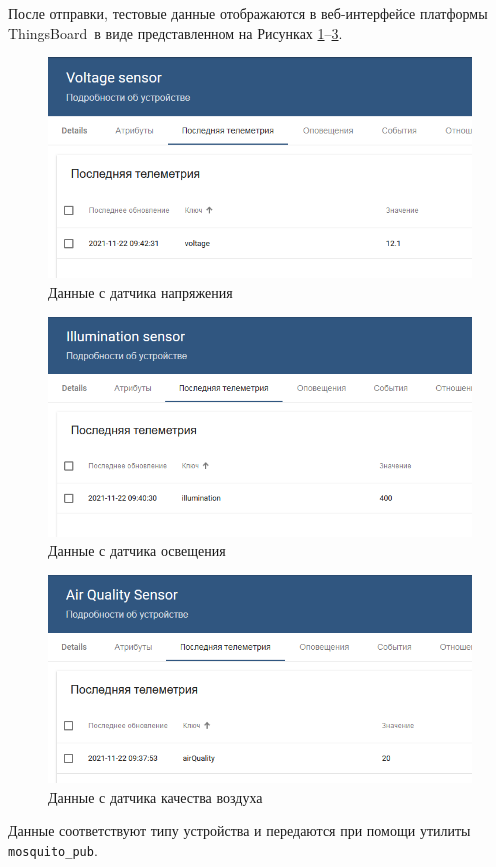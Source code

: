 \documentclass[utf8x]{G7-32} %
\newcommand{\tb}{ThingsBoard~}
\begin{document}
После отправки, тестовые данные отображаются в веб-интерфейсе платформы \tb в виде представленном на Рисунках \ref{fig:voltagedata}--\ref{fig:airqualitydata}. 
\begin{figure}[h!]
	\centering
	\includegraphics[width=0.7\linewidth]{images/VoltageData}
	\caption{Данные с датчика напряжения}
	\label{fig:voltagedata}
\end{figure}
\begin{figure}[h!]
	\centering
	\includegraphics[width=0.7\linewidth]{images/IlluminationData}
	\caption{Данные с датчика освещения}
	\label{fig:illuminationdata}
\end{figure}
\begin{figure}[h!]
	\centering
	\includegraphics[width=0.7\linewidth]{images/airQualityData}
	\caption{Данные с датчика качества воздуха}
	\label{fig:airqualitydata}
\end{figure}


Данные соответствуют типу устройства и передаются при помощи утилиты \texttt{mosquito\_pub}.
\end{document}
